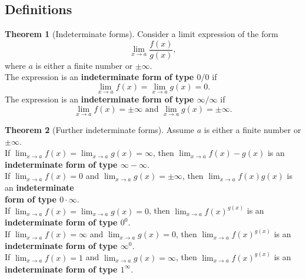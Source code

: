 \documentclass[11pt]{article}
\theoremstyle{definition}
\newtheorem*{comment}{Comment}
\theoremstyle{named}
\newtheorem*{namedtheorem}{Theorem}
\numberwithin{myalgctr}{section}
\begin{document}
\thispagestyle{fancy}
\subsection*{Definitions}
\begin{namedtheorem}[Indeterminate forms]Consider a limit expression of the form
  \[
  \lim_{x\to a}\frac{f(x)}{g(x)},
  \]
  where $a$ is either a finite number or $\pm\infty$.
  \vspace{.1in}
  \\
  The expression is an {\bf indeterminate form of type $0/0$} if
  \[
  \lim_{x\to a}f(x)=\lim_{x\to a}g(x)=0.
  \]
  The expression is an {\bf indeterminate form of type $\infty/\infty$} if
  \[
  \lim_{x\to a}f(x)=\pm\infty \text{ and } \lim_{x\to a}g(x)=\pm\infty.
  \]

\end{namedtheorem}
\begin{comment}
  A limit expression having an indeterminate form does {\em not} mean that the limit does not exist. You should interpret this conclusion as saying simply that our current analysis is not detailed enough to determine whether the limit exists and/or what that limit is.
  \vspace{.1in}
  \\
  In this spirit, we will be careful {\em not} to write
  \[
  \lim_{x\to a}\frac{f(x)}{g(x)}=\frac{0}{0} \text{ or } \lim_{x\to a}\frac{f(x)}{g(x)}=\frac{\infty}{\infty},
  \]
  as this suggests we are asserting something more definitive about the limit.

\end{comment}
\begin{namedtheorem}[Further indeterminate forms] Assume $a$ is either a finite number or $\pm\infty$.
  \vspace{.1in}
  \\
  If $\displaystyle\lim_{x\to a}f(x)=\lim_{x\to a}g(x)=\infty$, then
  $\displaystyle\lim_{x\to a}f(x)-g(x)$ is an {\bf indeterminate form of type $\infty-\infty$}.
  \vspace{.1in}
  \\
  If $\displaystyle\lim_{x\to a}f(x)=0$ and $\lim_{x\to a}g(x)=\pm\infty$, then
  $\displaystyle\lim_{x\to a}f(x)g(x)$ is an {\bf indeterminate \\ form of type $0\cdot\infty$}.
  \vspace{.1in}
  \\
  If $\displaystyle\lim_{x\to a}f(x)=\lim_{x\to a}g(x)=0$, then
  $\displaystyle\lim_{x\to a}f(x)^{g(x)}$ is an {\bf indeterminate form of type $0^0$}.
  \vspace{.1in}
  \\
  If $\displaystyle\lim_{x\to a}f(x)=\infty$ and $\lim_{x\to a}g(x)=0$, then
  $\displaystyle\lim_{x\to a}f(x)^{g(x)}$ is an {\bf indeterminate form  of type $\infty^0$}.
  \vspace{.1in}
  \\
  If $\displaystyle\lim_{x\to a}f(x)=1$ and $\lim_{x\to a}g(x)=\infty$, then
  $\displaystyle\lim_{x\to a}f(x)^{g(x)}$ is an {\bf indeterminate form of type $1^\infty$}.

\end{namedtheorem}
\end{document}
